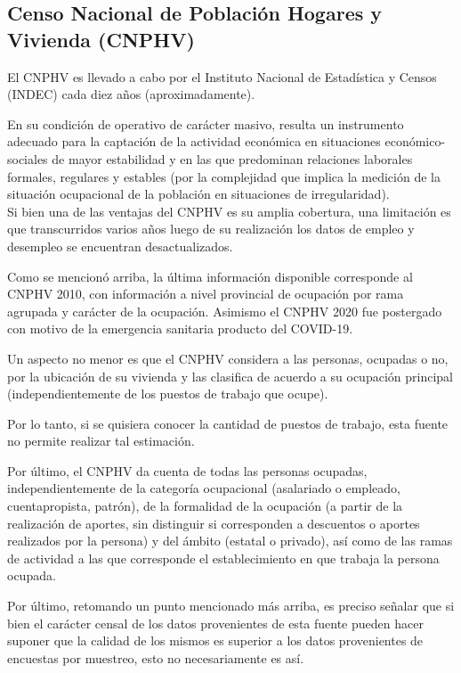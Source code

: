 \documentclass[
  openany]{book}
\begin{document}
\hypertarget{censo-nacional-de-poblaciuxf3n-hogares-y-vivienda-cnphv}{%
\subsection{Censo Nacional de Población Hogares y Vivienda (CNPHV)}\label{censo-nacional-de-poblaciuxf3n-hogares-y-vivienda-cnphv}}

El CNPHV es llevado a cabo por el Instituto Nacional de Estadística y Censos (INDEC) cada diez años (aproximadamente).

En su condición de operativo de carácter masivo, resulta un instrumento adecuado para la captación de la actividad económica en situaciones económico-sociales de mayor estabilidad y en las que predominan relaciones laborales formales, regulares y estables (por la complejidad que implica la medición de la situación ocupacional de la población en situaciones de irregularidad).\\

Si bien una de las ventajas del CNPHV es su amplia cobertura, una limitación es que transcurridos varios años luego de su realización los datos de empleo y desempleo se encuentran desactualizados.

Como se mencionó arriba, la última información disponible corresponde al CNPHV 2010, con información a nivel provincial de ocupación por rama agrupada y carácter de la ocupación.
Asimismo el CNPHV 2020 fue postergado con motivo de la emergencia sanitaria producto del COVID-19.

Un aspecto no menor es que el CNPHV considera a las personas, ocupadas o no, por la ubicación de su vivienda y las clasifica de acuerdo a su ocupación principal (independientemente de los puestos de trabajo que ocupe).

Por lo tanto, si se quisiera conocer la cantidad de puestos de trabajo, esta fuente no permite realizar tal estimación.

Por último, el CNPHV da cuenta de todas las personas ocupadas, independientemente de la categoría ocupacional (asalariado o empleado, cuentapropista, patrón), de la formalidad de la ocupación (a partir de la realización de aportes, sin distinguir si corresponden a descuentos o aportes realizados por la persona) y del ámbito (estatal o privado), así como de las ramas de actividad a las que corresponde el establecimiento en que trabaja la persona ocupada.

Por último, retomando un punto mencionado más arriba, es preciso señalar que si bien el carácter censal de los datos provenientes de esta fuente pueden hacer suponer que la calidad de los mismos es superior a los datos provenientes de encuestas por muestreo, esto no necesariamente es así.
\end{document}
